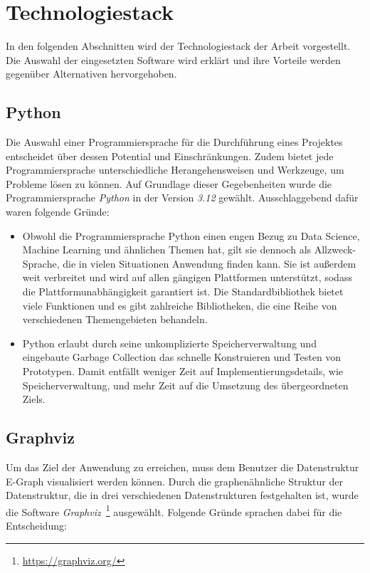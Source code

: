 \section{Technologiestack}\label{sec:entscheidungen}

In den folgenden Abschnitten wird der Technologiestack der Arbeit vorgestellt. Die Auswahl der eingesetzten Software wird erklärt und ihre Vorteile werden gegenüber Alternativen hervorgehoben.

\subsection{Python}

Die Auswahl einer Programmiersprache für die Durchführung eines Projektes entscheidet über dessen Potential und Einschränkungen.
Zudem bietet jede Programmiersprache unterschiedliche Herangehensweisen und Werkzeuge, um Probleme lösen zu können.
Auf Grundlage dieser Gegebenheiten wurde die Programmiersprache \textit{Python} in der Version \textit{3.12} gewählt.
Ausschlaggebend dafür waren folgende Gründe:

\begin{itemize}
    \item Obwohl die Programmiersprache Python einen engen Bezug zu Data Science, Machine Learning und ähnlichen Themen hat, gilt sie dennoch als Allzweck-Sprache,
    die in vielen Situationen Anwendung finden kann. Sie ist außerdem weit verbreitet und wird auf allen gängigen Plattformen unterstützt, sodass die Plattformunabhängigkeit garantiert ist. 
    Die Standardbibliothek bietet viele Funktionen und es gibt zahlreiche Bibliotheken, die eine Reihe von verschiedenen Themengebieten behandeln.
    \item Python erlaubt durch seine unkomplizierte Speicherverwaltung und eingebaute Garbage Collection das schnelle Konstruieren und Testen von Prototypen.
    Damit entfällt weniger Zeit auf Implementierungsdetails, wie Speicherverwaltung, und mehr Zeit auf die Umsetzung des übergeordneten Ziels.
\end{itemize}

\subsection{Graphviz}

Um das Ziel der Anwendung zu erreichen, muss dem Benutzer die Datenstruktur E-Graph visualisiert werden können. 
Durch die graphenähnliche Struktur der Datenstruktur, die in drei verschiedenen Datenstrukturen festgehalten ist, wurde die Software 
\textit{Graphviz}~\footnote{\hspace{1.5mm}\url{https://graphviz.org/}} ausgewählt. Folgende Gründe sprachen dabei für die Entscheidung:

